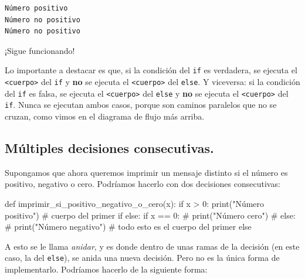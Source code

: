 \documentclass[
  letterpaper,
  DIV=11,
  numbers=noendperiod]{scrreprt}
\newenvironment{Shaded}{\begin{snugshade}}{\end{snugshade}}
\newcommand{\BuiltInTok}[1]{\textcolor[rgb]{0.00,0.23,0.31}{#1}}
\newcommand{\CommentTok}[1]{\textcolor[rgb]{0.37,0.37,0.37}{#1}}
\newcommand{\ControlFlowTok}[1]{\textcolor[rgb]{0.00,0.23,0.31}{#1}}
\newcommand{\DecValTok}[1]{\textcolor[rgb]{0.68,0.00,0.00}{#1}}
\newcommand{\KeywordTok}[1]{\textcolor[rgb]{0.00,0.23,0.31}{#1}}
\newcommand{\NormalTok}[1]{\textcolor[rgb]{0.00,0.23,0.31}{#1}}
\newcommand{\OperatorTok}[1]{\textcolor[rgb]{0.37,0.37,0.37}{#1}}
\newcommand{\StringTok}[1]{\textcolor[rgb]{0.13,0.47,0.30}{#1}}
\begin{document}
\begin{verbatim}
Número positivo
Número no positivo
Número no positivo
\end{verbatim}

¡Sigue funcionando!

Lo importante a destacar es que, si la condición del \texttt{if} es
verdadera, se ejecuta el \texttt{\textless{}cuerpo\textgreater{}} del
\texttt{if} y \textbf{no} se ejecuta el
\texttt{\textless{}cuerpo\textgreater{}} del \texttt{else}. Y viceversa:
si la condición del \texttt{if} es falsa, se ejecuta el
\texttt{\textless{}cuerpo\textgreater{}} del \texttt{else} y \textbf{no}
se ejecuta el \texttt{\textless{}cuerpo\textgreater{}} del \texttt{if}.
Nunca se ejecutan ambos casos, porque son caminos paralelos que no se
cruzan, como vimos en el diagrama de flujo más arriba.

\hypertarget{muxfaltiples-decisiones-consecutivas.}{%
\subsection{Múltiples decisiones
consecutivas.}\label{muxfaltiples-decisiones-consecutivas.}}

Supongamos que ahora queremos imprimir un mensaje distinto si el número
es positivo, negativo o cero. Podríamos hacerlo con dos decisiones
consecutivas:

\begin{Shaded}
\begin{Highlighting}[]
\KeywordTok{def}\NormalTok{ imprimir\_si\_positivo\_negativo\_o\_cero(x):}
  \ControlFlowTok{if}\NormalTok{ x }\OperatorTok{\textgreater{}} \DecValTok{0}\NormalTok{:}
      \BuiltInTok{print}\NormalTok{(}\StringTok{"Número positivo"}\NormalTok{) }\CommentTok{\# cuerpo del primer if}
  \ControlFlowTok{else}\NormalTok{:}
      \ControlFlowTok{if}\NormalTok{ x }\OperatorTok{==} \DecValTok{0}\NormalTok{:                      }\CommentTok{\#}
          \BuiltInTok{print}\NormalTok{(}\StringTok{"Número cero"}\NormalTok{)        }\CommentTok{\#}
      \ControlFlowTok{else}\NormalTok{:                           }\CommentTok{\#}
          \BuiltInTok{print}\NormalTok{(}\StringTok{"Número negativo"}\NormalTok{)    }\CommentTok{\# todo esto es el cuerpo del primer else}
\end{Highlighting}
\end{Shaded}

A esto se le llama \emph{anidar}, y es donde dentro de unas ramas de la
decisión (en este caso, la del \texttt{else}), se anida una nueva
decisión. Pero no es la única forma de implementarlo. Podríamos hacerlo
de la siguiente forma:
\end{document}
